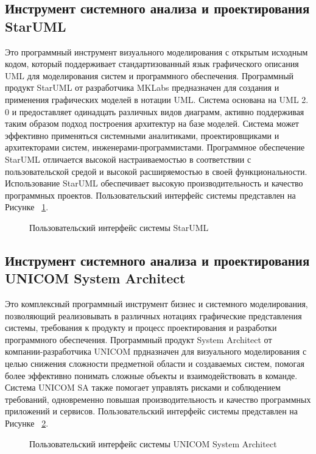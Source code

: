 \subsection{Инструмент системного анализа и проектирования StarUML}\label{sec:ch1/sec6/sub3}
Это программный инструмент визуального моделирования с открытым исходным кодом, который поддерживает стандартизованный язык графического описания UML для моделирования систем и программного обеспечения.
Программный продукт StarUML  от разработчика MKLabs предназначен для создания и применения графических моделей в нотации UML. Система основана на UML 2. 0 и предоставляет одинадцать различных видов диаграмм, активно поддерживая таким образом подход построения архитектур на базе моделей. Система может эффективно применяться системными аналитиками, проектировщиками и архитекторами систем, инженерами-программистами.
Программное обеспечение StarUML отличается высокой настраиваемостью в соответствии с пользовательской средой и высокой расширяемостью в своей функциональности. Использование StarUML обеспечивает высокую производительность и качество программных проектов.
Пользовательский интерфейс системы представлен на Рисунке ~\cref{fig:StarUML}.
\begin{figure}[ht1]
    \caption{Пользовательский интерфейс системы StarUML}\label{fig:StarUML}
\end{figure}

\subsection{Инструмент системного анализа и проектирования UNICOM System Architect}\label{sec:ch1/sec6/sub4}
Это комплексный программный инструмент бизнес и системного моделирования, позволяющий реализовывать в различных нотациях графические представления системы, требования к продукту и процесс проектирования и разработки программного обеспечения.
Программный продукт System Architect от компании-разработчика UNICOM прдназначен для визуального моделирования с целью снижения сложности предметной области и создаваемых систем, помогая более эффективно понимать сложные объекты и взаимодействовать в команде. Система UNICOM SA также помогает управлять рисками и соблюдением требований, одновременно повышая производительность и качество программных приложений и сервисов.
Пользовательский интерфейс системы представлен на Рисунке ~\cref{fig:UNICOM}.
\begin{figure}[ht1]
    \caption{Пользовательский интерфейс системы UNICOM System Architect}\label{fig:UNICOM}
\end{figure}

